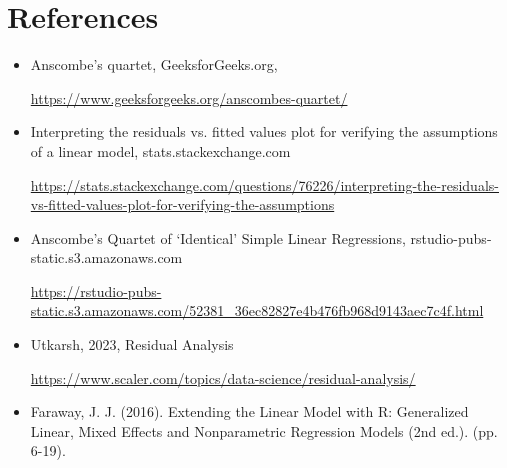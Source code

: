 \documentclass[12pt,doublespace]{article}
\begin{document}
		\section{References}
\begin{itemize}
	\item Anscombe’s quartet, GeeksforGeeks.org,
	
	\url{https://www.geeksforgeeks.org/anscombes-quartet/}
	\item Interpreting the residuals vs. fitted values plot for verifying the assumptions of a linear model, stats.stackexchange.com
	
	\url{https://stats.stackexchange.com/questions/76226/interpreting-the-residuals-vs-fitted-values-plot-for-verifying-the-assumptions}
	\item Anscombe’s Quartet of ‘Identical’ Simple Linear Regressions, rstudio-pubs-static.s3.amazonaws.com
	
	\url{https://rstudio-pubs-static.s3.amazonaws.com/52381_36ec82827e4b476fb968d9143aec7c4f.html}
	\item Utkarsh, 2023, Residual Analysis
	
	\url{https://www.scaler.com/topics/data-science/residual-analysis/}
	\item Faraway, J. J. (2016). Extending the Linear Model with R: Generalized Linear, Mixed Effects and Nonparametric Regression Models (2nd ed.). (pp. 6-19).
\end{itemize}



		
\end{document}
